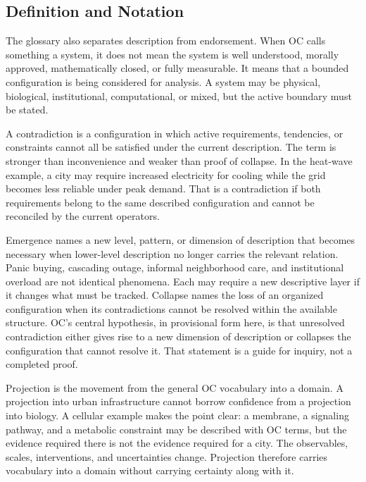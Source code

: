 \documentclass[11pt,a4paper,openany]{book}
\begin{document}
\subsection{Definition and Notation}
The glossary also separates description from endorsement. When OC calls something a system, it does not mean the system is well understood, morally approved, mathematically closed, or fully measurable. It means that a bounded configuration is being considered for analysis. A system may be physical, biological, institutional, computational, or mixed, but the active boundary must be stated. \cite{raf_networks,bak_soc}\par
A contradiction is a configuration in which active requirements, tendencies, or constraints cannot all be satisfied under the current description. The term is stronger than inconvenience and weaker than proof of collapse. In the heat-wave example, a city may require increased electricity for cooling while the grid becomes less reliable under peak demand. That is a contradiction if both requirements belong to the same described configuration and cannot be reconciled by the current operators.\par
Emergence names a new level, pattern, or dimension of description that becomes necessary when lower-level description no longer carries the relevant relation. Panic buying, cascading outage, informal neighborhood care, and institutional overload are not identical phenomena. Each may require a new descriptive layer if it changes what must be tracked. Collapse names the loss of an organized configuration when its contradictions cannot be resolved within the available structure. OC's central hypothesis, in provisional form here, is that unresolved contradiction either gives rise to a new dimension of description or collapses the configuration that cannot resolve it. That statement is a guide for inquiry, not a completed proof.\par
Projection is the movement from the general OC vocabulary into a domain. A projection into urban infrastructure cannot borrow confidence from a projection into biology. A cellular example makes the point clear: a membrane, a signaling pathway, and a metabolic constraint may be described with OC terms, but the evidence required there is not the evidence required for a city. The observables, scales, interventions, and uncertainties change. Projection therefore carries vocabulary into a domain without carrying certainty along with it.\par
\end{document}
